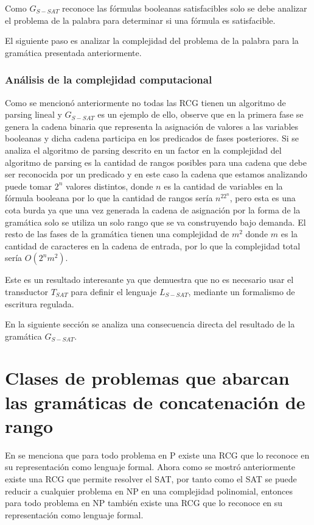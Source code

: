 Como $G_{S-SAT}$ reconoce las fórmulas booleanas satisfacibles solo se debe analizar el problema de la
palabra para determinar si una fórmula es satisfacible.


El siguiente paso es analizar la complejidad del problema de la palabra para la gramática presentada anteriormente.

\subsubsection{Análisis de la complejidad computacional}

Como se mencionó anteriormente no todas las RCG tienen un algoritmo de parsing lineal y $G_{S-SAT}$ es un ejemplo de
ello, observe que en la primera fase se genera la cadena binaria que representa la asignación de valores a las variables
booleanas y dicha cadena participa en los predicados de fases posteriores. Si se analiza el algoritmo de parsing descrito en
\cite{mainRCGBib} un factor en la complejidad del algoritmo de parsing es la cantidad de rangos posibles para una cadena
que debe ser reconocida por un predicado y en este caso la cadena que estamos analizando puede tomar $2^n$ valores distintos, donde
$n$ es la cantidad de variables en la fórmula booleana por lo que la cantidad de rangos sería $n^22^n$, pero esta es una cota
burda ya que una vez generada la cadena de asignación por la forma de la gramática solo se utiliza un solo rango que se va construyendo
bajo demanda. El resto de las fases de la gramática tienen una complejidad de $m^2$ donde $m$ es la cantidad de caracteres
en la cadena de entrada, por lo que la complejidad total sería $O(2^nm^2)$.

Este es un resultado interesante ya que demuestra que no es necesario usar el transductor $T_{SAT}$ para definir el
lenguaje $L_{S-SAT}$, mediante un formalismo de escritura regulada.

En la siguiente sección se analiza una consecuencia directa del resultado de la gramática $G_{S-SAT}$.

\section{Clases de problemas que abarcan las gramáticas de concatenación de rango}

En \cite{propertiesRCGBib2} se menciona que para todo problema en P existe una RCG que lo reconoce en su representación
como lenguaje formal. Ahora como se mostró anteriormente existe una RCG que permite resolver el SAT, por tanto
como el SAT se puede reducir a cualquier problema en NP en una complejidad polinomial, entonces para todo
problema en NP también existe una RCG que lo reconoce en su representación como lenguaje formal.

